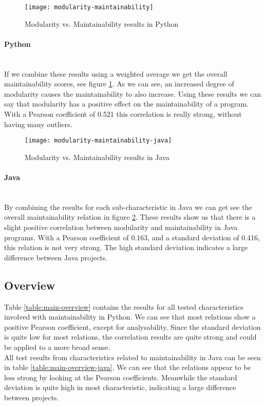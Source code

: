 \documentclass[twoside]{uva-inf-bachelor-thesis}
\newcommand{\myparagraph}[1]{\paragraph{#1}\mbox{}\\}
\begin{document}
\begin{figure}[H]
    \caption{Modularity vs. Maintainability results in Python}
    \label{figure:mod-main}
    \centering
        \texttt{[image: modularity-maintainability]}
\end{figure}

\myparagraph{Python}
If we combine these results using a weighted average we get the overall maintainability scores, see figure \ref{figure:mod-main}. As we can see, an increased degree of modularity causes the maintainability to also increase. Using these results we can say that modularity has a positive effect on the maintainability of a program. With a Pearson coefficient of 0.521 this correlation is really strong, without having many outliers.

\begin{figure}[H]
    \caption{Modularity vs. Maintainability results in Java}
    \label{figure:mod-main-java}
    \centering
        \texttt{[image: modularity-maintainability-java]}
\end{figure}

\myparagraph{Java}
By combining the results for each sub-characteristic in Java we can get see the overall maintainability relation in figure \ref{figure:mod-main-java}. These results show us that there is a slight positive correlation between modularity and maintainability in Java programs. With a Pearson coefficient of 0.163, and a standard deviation of 0.416, this relation is not very strong. The high standard deviation indicates a large difference between Java projects.

\subsection{Overview}
Table \ref{table:main-overview} contains the results for all tested characteristics involved with maintainability in Python. We can see that most relations show a positive Pearson coefficient, except for analysability. Since the standard deviation is quite low for most relations, the correlation results are quite strong and could be applied to a more broad sense.\\

All test results from characteristics related to maintainability in Java can be seen in table \ref{table:main-overview-java}. We can see that the relations appear to be less strong by looking at the Pearson coefficients. Meanwhile the standard deviation is quite high in most characteristic, indicating a large difference between projects.
\end{document}
